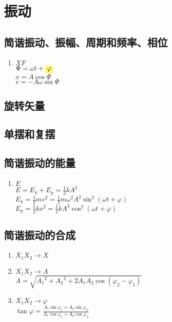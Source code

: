 \documentclass[UTF8,a4paper,12pt,scheme=chinese]{ctexbook}
\newcommand{\hla}[1]{%
	\colorbox{yellow!50}{$\displaystyle#1$}}
\begin{document}
	\chapter{振动}
	\section{简谐振动、振幅、周期和频率、相位}
	\begin{enumerate}
		\item $XF$\\
		$\Phi = \omega t+\hla{\varphi}$\\
		$x=A\cos\Phi$\\
		$v=-A\omega\sin\Phi$
		
	\end{enumerate}
	\section{旋转矢量}
	\section{单摆和复摆}
	\section{简谐振动的能量}
	\begin{enumerate}
		\item $E$\\
		$E=E_k+E_p=\frac{1}{2}kA^2$\\
		$\displaystyle
		E_k=\frac{1}{2}mv^2=\frac{1}{2}m\omega^2A^2\sin^2(\omega t+\varphi)$\\
		$\displaystyle
		E_p=\frac{1}{2}kx^2=\frac{1}{2}kA^2\cos^2(\omega t+\varphi)$
	\end{enumerate}
	
	\section{简谐振动的合成}
	\begin{enumerate}
		\item $X_1X_2\rightarrow X$
		\item $X_1X_2\rightarrow A$\\
		$A=\sqrt{{A_1}^2+{A_2}^2+2A_1A_2\cos(\varphi_2-\varphi_1)}$
		\item $X_1X_2\rightarrow \varphi$\\
		$\displaystyle
		\tan \varphi=\frac{A_1\sin\varphi_1+A_2\sin\varphi_2}{A_1\cos\varphi_1+A_2\cos\varphi_2}$
		
	\end{enumerate}
	\newpage
\end{document}
